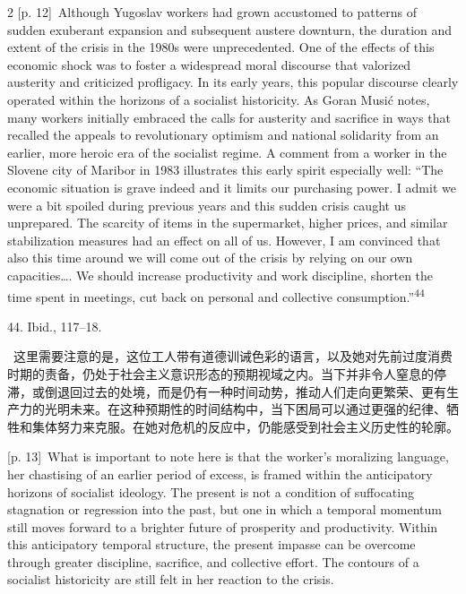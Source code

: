\documentclass[10pt,a4paper]{article}
\begin{document}
\begin{paracol}{2}
{\scriptsize\color{gray} [p. 12]}\ Although Yugoslav workers had grown accustomed to patterns of sudden exuberant expansion and subsequent austere downturn, the duration and extent of the crisis in the 1980s were unprecedented. One of the effects of this economic shock was to foster a widespread moral discourse that valorized austerity and criticized profligacy. In its early years, this popular discourse clearly operated within the horizons of a socialist historicity. As Goran Musić notes, many workers initially embraced the calls for austerity and sacrifice in ways that recalled the appeals to revolutionary optimism and national solidarity from an earlier, more heroic era of the socialist regime. A comment from a worker in the Slovene city of Maribor in 1983 illustrates this early spirit especially well: “The economic situation is grave indeed and it limits our purchasing power. I admit we were a bit spoiled during previous years and this sudden crisis caught us unprepared. The scarcity of items in the supermarket, higher prices, and similar stabilization measures had an effect on all of us. However, I am convinced that also this time around we will come out of the crisis by relying on our own capacities…. We should increase productivity and work discipline, shorten the time spent in meetings, cut back on personal and collective consumption.”\nobreak\textsuperscript{44}\par{\small 44. Ibid., 117–18.\par}
\switchcolumn*
{\scriptsize\color{gray} [p. 13]}\ 这里需要注意的是，这位工人带有道德训诫色彩的语言，以及她对先前过度消费时期的责备，仍处于社会主义意识形态的预期视域之内。当下并非令人窒息的停滞，或倒退回过去的处境，而是仍有一种时间动势，推动人们走向更繁荣、更有生产力的光明未来。在这种预期性的时间结构中，当下困局可以通过更强的纪律、牺牲和集体努力来克服。在她对危机的反应中，仍能感受到社会主义历史性的轮廓。\par
\switchcolumn
{\scriptsize\color{gray} [p. 13]}\ What is important to note here is that the worker’s moralizing language, her chastising of an earlier period of excess, is framed within the anticipatory horizons of socialist ideology. The present is not a condition of suffocating stagnation or regression into the past, but one in which a temporal momentum still moves forward to a brighter future of prosperity and productivity. Within this anticipatory temporal structure, the present impasse can be overcome through greater discipline, sacrifice, and collective effort. The contours of a socialist historicity are still felt in her reaction to the crisis.\par

\end{paracol}
\end{document}
